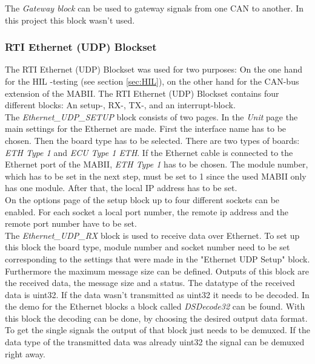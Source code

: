 \documentclass[ExampleMasters.tex]{subfiles}
\begin{document}
The \textit{Gateway block} can be used to gateway signals from one \gls{CAN} to another. In this project this block wasn't used. 
\subsubsection{RTI Ethernet (UDP) Blockset}
The \gls{RTI} Ethernet (\gls{UDP}) Blockset was used for two purposes: On the one hand for the \gls{HIL} -testing (see section \ref{sec:HIL}), on the other hand for the \gls{CAN}-bus extension of the \gls{MABII}. The \gls{RTI} Ethernet (UDP) Blockset contains four different blocks: An setup-, RX-, TX-, and an interrupt-block.\\
The \textit{Ethernet\_UDP\_SETUP} block consists of two pages. In the \textit{Unit} page the main settings for the Ethernet are made. First the interface name has to be chosen. Then the board type has to be selected. There are two types of boards: \textit{ETH Type 1} and \textit{ECU Type 1 ETH}. If the Ethernet cable is connected to the Ethernet port of the \gls{MABII}, \textit{ETH Type 1} has to be chosen. The module number, which has to be set in the next step, must be set to 1 since the used \gls{MABII} only has one module.
After that, the local \gls{IP} address has to be set.\\
On the options page of the setup block up to four different sockets can be enabled. For each socket a local port number, the remote ip address and the remote port number have to be set.\\
 
The \textit{Ethernet\_UDP\_RX} block is used to receive data over Ethernet. To set up this block the board type, module number and socket number need to be set corresponding to the settings that were made in the "Ethernet \gls{UDP} Setup" block. Furthermore the maximum message size can be defined. Outputs of this block are the received data, the message size and a status. The datatype of the received data is uint32. If the data wasn't transmitted as uint32 it needs to be decoded. In the demo for the Ethernet blocks a block called \textit{DSDecode32} can be found. With this block the decoding can be done, by choosing the desired output data format. To get the single signals the output of that block just needs to be demuxed. If the data type of the transmitted data was already uint32 the signal can be demuxed right away.
\end{document}
